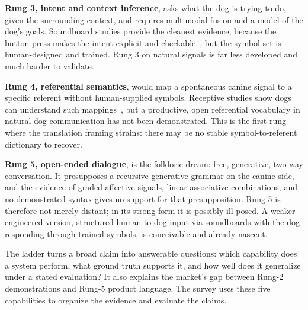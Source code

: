 \textbf{Rung 3, intent and context inference}, asks what the dog is trying
to do, given the surrounding context, and requires multimodal fusion and a
model of the dog's goals. Soundboard studies provide the cleanest evidence,
because the button press makes the intent explicit and
checkable~\cite{bastos2024plos,bastos2024scirep}, but the symbol set is
human-designed and trained. Rung 3 on natural signals is far less developed
and much harder to validate.

\textbf{Rung 4, referential semantics}, would map a spontaneous canine
signal to a specific referent without human-supplied symbols. Receptive
studies show dogs can understand such
mappings~\cite{kaminski2004rico,pilley2011chaser}, but a productive, open
referential vocabulary in natural dog communication has not been
demonstrated. This is the first rung where the translation framing strains:
there may be no stable symbol-to-referent dictionary to recover.

\textbf{Rung 5, open-ended dialogue}, is the folkloric dream: free,
generative, two-way conversation. It presupposes a recursive generative
grammar on the canine side, and the evidence of graded affective signals,
linear associative combinations, and no demonstrated syntax gives no
support for that presupposition. Rung 5 is therefore not merely distant; in
its strong form it is possibly ill-posed. A weaker engineered version,
structured human-to-dog input via soundboards with the dog responding
through trained symbols, is conceivable and already nascent.

The ladder turns a broad claim into answerable questions: which capability
does a system perform, what ground truth supports it, and how well does it
generalize under a stated evaluation? It also explains the market's gap
between Rung-2 demonstrations and Rung-5 product language. The survey uses
these five capabilities to organize the evidence and evaluate the claims.
